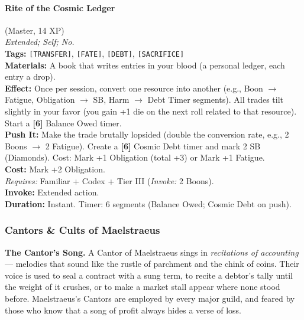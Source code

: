 \paragraph{Rite of the Cosmic Ledger} (Master, 14 XP) \hfill \\
\emph{Extended; Self; No.} \\
\textbf{Tags:} \texttt{[TRANSFER]}, \texttt{[FATE]}, \texttt{[DEBT]}, \texttt{[SACRIFICE]} \\
\textbf{Materials:} A book that writes entries in your blood (a personal ledger, each entry a drop). \\
\textbf{Effect:} Once per session, convert one resource into another (e.g., Boon $\rightarrow$ Fatigue, Obligation $\rightarrow$ SB, Harm $\rightarrow$ Debt Timer segments). All trades tilt slightly in your favor (you gain +1 die on the next roll related to that resource). Start a \textbf{[6]} Balance Owed timer. \\
\textbf{Push It:} Make the trade brutally lopsided (double the conversion rate, e.g., 2 Boons $\rightarrow$ 2 Fatigue). Create a \textbf{[6]} Cosmic Debt timer and mark 2 SB (Diamonds). Cost: Mark +1 Obligation (total +3) or Mark +1 Fatigue. \\
\textbf{Cost:} Mark +2 Obligation. \\
\textit{Requires:} Familiar + Codex + Tier III (\textit{Invoke:} 2 Boons). \\
\textbf{Invoke:} Extended action. \\
\textbf{Duration:} Instant. Timer: 6 segments (Balance Owed; Cosmic Debt on push).

\subsubsection*{Cantors \& Cults of Maelstraeus}

\textbf{The Cantor's Song.} A Cantor of Maelstraeus sings in \textit{recitations of accounting} --- melodies that sound like the rustle of parchment and the chink of coins. Their voice is used to seal a contract with a sung term, to recite a debtor's tally until the weight of it crushes, or to make a market stall appear where none stood before. Maelstraeus's Cantors are employed by every major guild, and feared by those who know that a song of profit always hides a verse of loss.

